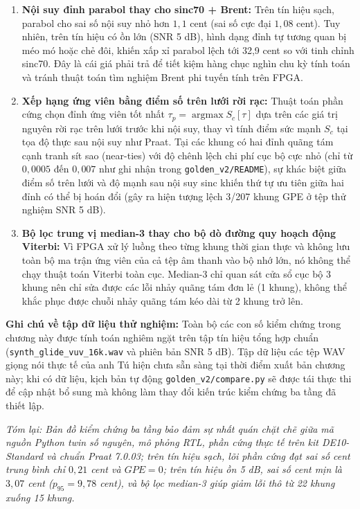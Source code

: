 \begin{enumerate}[leftmargin=1.5em, itemsep=3pt]
    \item \textbf{Nội suy đỉnh parabol thay cho sinc70 + Brent:} Trên tín hiệu sạch, parabol cho sai số nội suy nhỏ hơn $1{,}1$ cent (sai số cực đại $1{,}08$ cent). Tuy nhiên, trên tín hiệu có ồn lớn (SNR 5 dB), hình dạng đỉnh tự tương quan bị méo mó hoặc chẻ đôi, khiến xấp xỉ parabol lệch tới 32,9 cent so với tinh chỉnh sinc70. Đây là cái giá phải trả để tiết kiệm hàng chục nghìn chu kỳ tính toán và tránh thuật toán tìm nghiệm Brent phi tuyến tính trên FPGA.
    \item \textbf{Xếp hạng ứng viên bằng điểm số trên lưới rời rạc:} Thuật toán phần cứng chọn đỉnh ứng viên tốt nhất $\tau_p = \operatorname{argmax} S_c[\tau]$ dựa trên các giá trị nguyên rời rạc trên lưới trước khi nội suy, thay vì tính điểm sức mạnh $S_c$ tại tọa độ thực sau nội suy như Praat. Tại các khung có hai đỉnh quãng tám cạnh tranh sít sao (near-ties) với độ chênh lệch chi phí cục bộ cực nhỏ (chỉ từ $0{,}0005$ đến $0{,}007$ như ghi nhận trong \texttt{golden\_v2/README}), sự khác biệt giữa điểm số trên lưới và độ mạnh sau nội suy sinc khiến thứ tự ưu tiên giữa hai đỉnh có thể bị hoán đổi (gây ra hiện tượng lệch 3/207 khung GPE ở tệp thử nghiệm SNR 5 dB).
    \item \textbf{Bộ lọc trung vị median-3 thay cho bộ dò đường quy hoạch động Viterbi:} Vì FPGA xử lý luồng theo từng khung thời gian thực và không lưu toàn bộ ma trận ứng viên của cả tệp âm thanh vào bộ nhớ lớn, nó không thể chạy thuật toán Viterbi toàn cục. Median-3 chỉ quan sát cửa sổ cục bộ 3 khung nên chỉ sửa được các lỗi nhảy quãng tám đơn lẻ (1 khung), không thể khắc phục được chuỗi nhảy quãng tám kéo dài từ 2 khung trở lên.
\end{enumerate}

\noindent\textbf{Ghi chú về tập dữ liệu thử nghiệm:} Toàn bộ các con số kiểm chứng trong chương này được tính toán nghiêm ngặt trên tập tín hiệu tổng hợp chuẩn (\texttt{synth\_glide\_vuv\_16k.wav} và phiên bản SNR 5 dB). Tập dữ liệu các tệp WAV giọng nói thực tế của anh Tú hiện chưa sẵn sàng tại thời điểm xuất bản chương này; khi có dữ liệu, kịch bản tự động \texttt{golden\_v2/compare.py} sẽ được tái thực thi để cập nhật bổ sung mà không làm thay đổi kiến trúc kiểm chứng ba tầng đã thiết lập.

\textit{Tóm lại: Bản đồ kiểm chứng ba tầng bảo đảm sự nhất quán chặt chẽ giữa mã nguồn Python twin số nguyên, mô phỏng RTL, phần cứng thực tế trên kit DE10-Standard và chuẩn Praat 7.0.03; trên tín hiệu sạch, lõi phần cứng đạt sai số cent trung bình chỉ $0{,}21$ cent và $GPE = 0$; trên tín hiệu ồn 5 dB, sai số cent mịn là $3{,}07$ cent ($p_{95} = 9{,}78$ cent), và bộ lọc median-3 giúp giảm lỗi thô từ 22 khung xuống 15 khung.}

